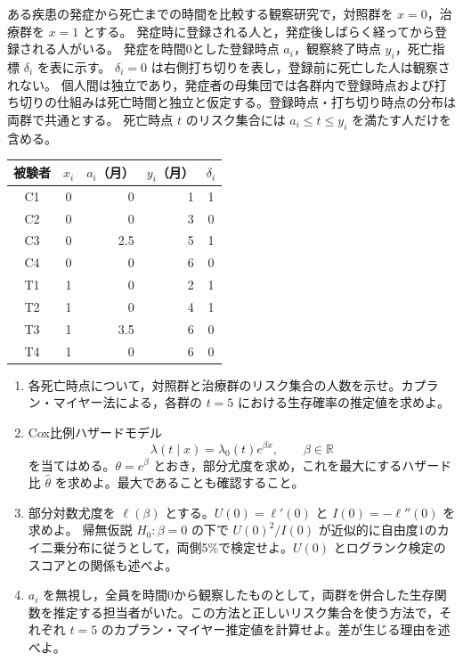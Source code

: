 \documentclass[a4paper,11pt]{ltjsarticle}
\begin{document}
ある疾患の発症から死亡までの時間を比較する観察研究で，対照群を $x=0$，治療群を $x=1$ とする。
発症時に登録される人と，発症後しばらく経ってから登録される人がいる。
発症を時間0とした登録時点 $a_i$，観察終了時点 $y_i$，死亡指標 $\delta_i$ を表に示す。
$\delta_i=0$ は右側打ち切りを表し，登録前に死亡した人は観察されない。
個人間は独立であり，発症者の母集団では各群内で登録時点および打ち切りの仕組みは死亡時間と独立と仮定する。登録時点・打ち切り時点の分布は両群で共通とする。
死亡時点 $t$ のリスク集合には $a_i\leq t\leq y_i$ を満たす人だけを含める。
\begin{center}
\begin{tabular}{ccrrc}
\toprule
被験者 & $x_i$ & $a_i$（月） & $y_i$（月） & $\delta_i$\\
\midrule
C1 & 0 & 0 & 1 & 1\\
C2 & 0 & 0 & 3 & 0\\
C3 & 0 & 2.5 & 5 & 1\\
C4 & 0 & 0 & 6 & 0\\
T1 & 1 & 0 & 2 & 1\\
T2 & 1 & 0 & 4 & 1\\
T3 & 1 & 3.5 & 6 & 0\\
T4 & 1 & 0 & 6 & 0\\
\bottomrule
\end{tabular}
\end{center}
\begin{enumerate}
\item 各死亡時点について，対照群と治療群のリスク集合の人数を示せ。カプラン・マイヤー法による，各群の $t=5$ における生存確率の推定値を求めよ。
\item Cox比例ハザードモデル
\[
\lambda(t\mid x)=\lambda_0(t)e^{\beta x},\qquad \beta\in\mathbb R
\]
を当てはめる。$\theta=e^\beta$ とおき，部分尤度を求め，これを最大にするハザード比 $\hat\theta$ を求めよ。最大であることも確認すること。
\item 部分対数尤度を $\ell(\beta)$ とする。$U(0)=\ell'(0)$ と $I(0)=-\ell''(0)$ を求めよ。
帰無仮説 $H_0:\beta=0$ の下で $U(0)^2/I(0)$ が近似的に自由度1のカイ二乗分布に従うとして，両側5\%で検定せよ。$U(0)$ とログランク検定のスコアとの関係も述べよ。
\item $a_i$ を無視し，全員を時間0から観察したものとして，両群を併合した生存関数を推定する担当者がいた。この方法と正しいリスク集合を使う方法で，それぞれ $t=5$ のカプラン・マイヤー推定値を計算せよ。差が生じる理由を述べよ。
\end{enumerate}
\newpage
\end{document}
